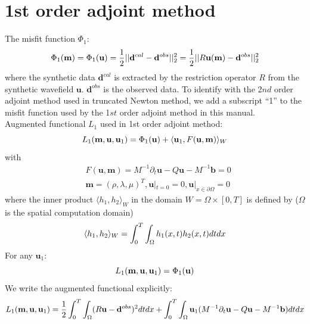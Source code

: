 \documentclass[pdftex,a4paper,parskip,listof=totoc,bibliography=totoc,onehalfspacing,12pt]{scrreprt}
\begin{document}
\section{1st order adjoint method}
The misfit function $\Phi_1$:
\begin{equation}
 \Phi_1(\mathbf{m}) = \Phi_1(\mathbf{u}) = \frac{1}{2} || \mathbf{d}^{cal} - \mathbf{d}^{obs} ||_2^2 = \frac{1}{2} || R\mathbf{u}(\mathbf{m}) - \mathbf{d}^{obs} ||_2^2 \\
\end{equation}
where the synthetic data $\mathbf{d}^{cal}$ is extracted by the restriction operator $R$ from the synthetic wavefield $\mathbf{u}$. $\mathbf{d}^{obs}$ is the observed data. To identify with the 2$nd$ order adjoint method used in truncated Newton method, we add a subscript ``1'' to the misfit function used by the 1$st$ order adjoint method in this manual.\\
Augmented functional $L_1$ used in 1st order adjoint method:
\begin{equation}
 L_1(\mathbf{m}, \mathbf{u},\mathbf{u}_{1}) = \Phi_1(\mathbf{u}) + \langle \mathbf{u}_{1}, F(\mathbf{u},\mathbf{m}) \rangle_W \\
\end{equation}
with
\begin{equation}
\begin{split}
\label{eqn:initialCondition1}
 & F(\mathbf{u},\mathbf{m}) = M^{-1} \partial_{t} \mathbf{u}  - Q\mathbf{u} - M^{-1} \mathbf{b} = 0 \\
 & \mathbf{m} = (\rho, \lambda, \mu)^T, \mathbf{u}|_{t=0} = 0, \mathbf{u}|_{x\in \partial \Omega} = 0
 \end{split}
\end{equation}
where the inner product $\langle h_1, h_2 \rangle_W$ in the domain $W=\Omega \times [0, T]$ is defined by ($\Omega$ is the spatial computation domain)\\
\begin{equation}
 \langle h_1, h_2 \rangle_W = \int_0^T \int_\Omega h_1(x,t) h_2(x,t) dt dx\\
\end{equation}
For any $\mathbf{u}_{1}$:
\begin{equation}
 L_1(\mathbf{m}, \mathbf{u},\mathbf{u}_{1}) = \Phi_1(\mathbf{u}) \\
\end{equation}
We write the augmented functional explicitly:
\begin{equation}
\label{eqn:AugmentFunctional}
 L_1(\mathbf{m}, \mathbf{u},\mathbf{u}_{1}) = \frac{1}{2} \int_0^T \int_\Omega (R\mathbf{u} - \mathbf{d}^{obs})^2 dt dx + \int_0^T \int_\Omega \mathbf{u}_{1} (M^{-1} \partial_{t} \mathbf{u} - Q \mathbf{u} - M^{-1} \mathbf{b})  dt dx\\
\end{equation}
\end{document}
